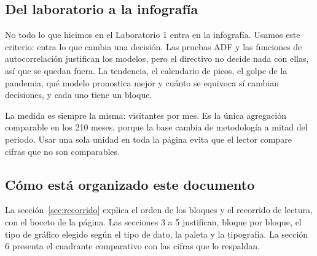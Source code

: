 \subsection{Del laboratorio a la infografía}

No todo lo que hicimos en el Laboratorio 1 entra en la infografía. Usamos este
criterio: entra lo que cambia una decisión. Las pruebas ADF y las funciones de
autocorrelación justifican los modelos, pero el directivo no decide nada con
ellas, así que se quedan fuera. La tendencia, el calendario de picos, el golpe de
la pandemia, qué modelo pronostica mejor y cuánto se equivoca sí cambian
decisiones, y cada uno tiene un bloque.

La medida es siempre la misma: visitantes por mes. Es la única agregación
comparable en los 210 meses, porque la base cambia de metodología a mitad del
periodo. Usar una sola unidad en toda la página evita que el lector compare
cifras que no son comparables.

\subsection{Cómo está organizado este documento}

La sección~\ref{sec:recorrido} explica el orden de los bloques y el recorrido de
lectura, con el boceto de la página. Las secciones 3 a 5 justifican, bloque por
bloque, el tipo de gráfico elegido según el tipo de dato, la paleta y la
tipografía. La sección 6 presenta el cuadrante comparativo con las cifras que
lo respaldan.
